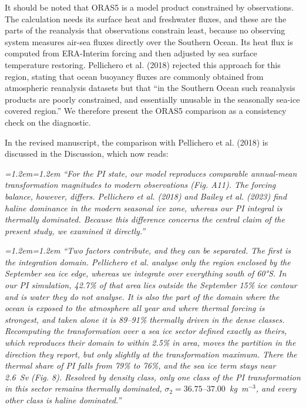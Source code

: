 \documentclass[11pt,a4paper]{article}
\newenvironment{change}{\par\smallskip\color{chgcol}\small\itshape\leftskip=1.2em\rightskip=1.2em\noindent\ignorespaces}{\par\smallskip}
\begin{document}
It should be noted that ORAS5 is a model product constrained by observations. The calculation needs its surface heat and freshwater fluxes, and these are the parts of the reanalysis that observations constrain least, because no observing system measures air-sea fluxes directly over the Southern Ocean. Its heat flux is computed from ERA-Interim forcing and then adjusted by sea surface temperature restoring. Pellichero et al. (2018) rejected this approach for this region, stating that ocean buoyancy fluxes are commonly obtained from atmospheric reanalysis datasets but that ``in the Southern Ocean such reanalysis products are poorly constrained, and essentially unusable in the seasonally sea-ice covered region.'' We therefore present the ORAS5 comparison as a consistency check on the diagnostic.

In the revised manuscript, the comparison with Pellichero et al. (2018) is discussed in the Discussion, which now reads:

\begin{change}
``For the PI state, our model reproduces comparable annual-mean transformation magnitudes to modern observations (Fig. A11). The forcing balance, however, differs. Pellichero et al. (2018) and Bailey et al. (2023) find haline dominance in the modern seasonal ice zone, whereas our PI integral is thermally dominated. Because this difference concerns the central claim of the present study, we examined it directly.''
\end{change}

\begin{change}
``Two factors contribute, and they can be separated. The first is the integration domain. Pellichero et al. analyse only the region enclosed by the September sea ice edge, whereas we integrate over everything south of 60°S. In our PI simulation, 42.7\% of that area lies outside the September 15\% ice contour and is water they do not analyse. It is also the part of the domain where the ocean is exposed to the atmosphere all year and where thermal forcing is strongest, and taken alone it is 89--91\% thermally driven in the dense classes. Recomputing the transformation over a sea ice sector defined exactly as theirs, which reproduces their domain to within 2.5\% in area, moves the partition in the direction they report, but only slightly at the transformation maximum. There the thermal share of PI falls from 79\% to 76\%, and the sea ice term stays near 2.6~Sv (Fig. 8). Resolved by density class, only one class of the PI transformation in this sector remains thermally dominated, $\sigma_2 = 36.75$--$37.00$~kg~m$^{-3}$, and every other class is haline dominated.''
\end{change}
\end{document}
